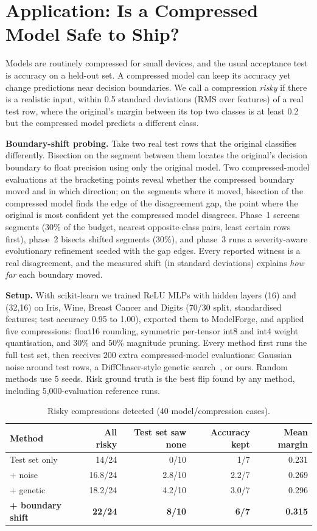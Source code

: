 \documentclass[conference]{IEEEtran}
\begin{document}
\section{Application: Is a Compressed Model Safe to Ship?}\label{sec:shrink}
Models are routinely compressed for small devices, and the usual acceptance test is accuracy on a held-out set. A compressed model can keep its accuracy yet change predictions near decision boundaries. We call a compression \emph{risky} if there is a realistic input, within 0.5 standard deviations (RMS over features) of a real test row, where the original's margin between its top two classes is at least 0.2 but the compressed model predicts a different class.

\textbf{Boundary-shift probing.} Take two real test rows that the original classifies differently. Bisection on the segment between them locates the original's decision boundary to float precision using only the original model. Two compressed-model evaluations at the bracketing points reveal whether the compressed boundary moved and in which direction; on the segments where it moved, bisection of the compressed model finds the edge of the disagreement gap, the point where the original is most confident yet the compressed model disagrees. Phase~1 screens segments (30\% of the budget, nearest opposite-class pairs, least certain rows first), phase~2 bisects shifted segments (30\%), and phase~3 runs a severity-aware evolutionary refinement seeded with the gap edges. Every reported witness is a real disagreement, and the measured shift (in standard deviations) explains \emph{how far} each boundary moved.

\textbf{Setup.} With scikit-learn we trained ReLU MLPs with hidden layers (16) and (32,16) on Iris, Wine, Breast Cancer and Digits (70/30 split, standardised features; test accuracy 0.95 to 1.00), exported them to ModelForge, and applied five compressions: float16 rounding, symmetric per-tensor int8 and int4 weight quantisation, and 30\% and 50\% magnitude pruning. Every method first runs the full test set, then receives 200 extra compressed-model evaluations: Gaussian noise around test rows, a DiffChaser-style genetic search~\cite{diffchaser}, or ours. Random methods use 5 seeds. Risk ground truth is the best flip found by any method, including 5{,}000-evaluation reference runs.

\begin{table}[t]
\centering
\caption{Risky compressions detected (40 model/compression cases).}
\label{tab:shrink}
\setlength{\tabcolsep}{3pt}
\begin{tabular}{lrrrr}
\toprule
Method & All risky & Test set saw none & Accuracy kept & Mean margin\\
\midrule
Test set only & 14/24 & 0/10 & 1/7 & 0.231\\
+ noise & 16.8/24 & 2.8/10 & 2.2/7 & 0.269\\
+ genetic & 18.2/24 & 4.2/10 & 3.0/7 & 0.296\\
\textbf{+ boundary shift} & \textbf{22/24} & \textbf{8/10} & \textbf{6/7} & \textbf{0.315}\\
\bottomrule
\end{tabular}
\end{table}
\end{document}
